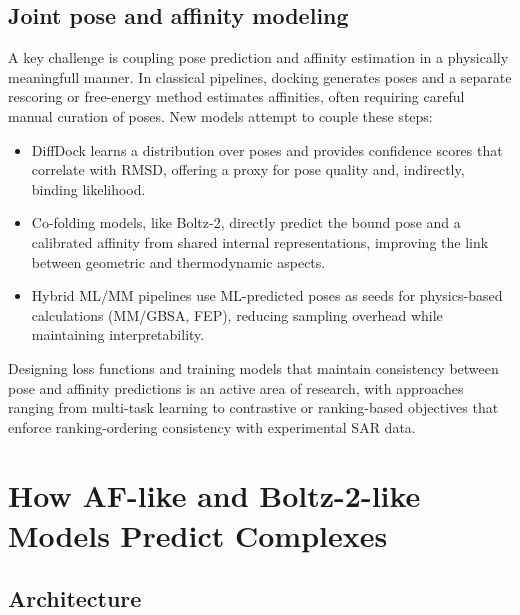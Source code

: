 \documentclass[12pt]{article}
\begin{document}
\subsection{Joint pose and affinity modeling}

A key challenge is coupling pose prediction and affinity estimation in a physically meaningfull manner. In classical pipelines, docking generates poses and a separate rescoring or free-energy method estimates affinities, often requiring careful manual curation of poses. New models attempt to couple these steps:
\begin{itemize}
  \item DiffDock learns a distribution over poses and provides confidence scores that correlate with RMSD, offering a proxy for pose quality and, indirectly, binding likelihood.
  \item Co-folding models, like Boltz-2, directly predict the bound pose and a calibrated affinity from shared internal representations, improving the link between geometric and thermodynamic aspects.\cite{CH13_passaro2025boltz2}
  \item Hybrid ML/MM pipelines use ML-predicted poses as seeds for physics-based calculations (MM/GBSA, FEP), reducing sampling overhead while maintaining interpretability.
\end{itemize}

Designing loss functions and training models that maintain consistency between pose and affinity predictions is an active area of research, with approaches ranging from multi-task learning to contrastive or ranking-based objectives that enforce ranking-ordering consistency with experimental SAR data.\cite{CH13_shen2023generalized,CH13_durant2025robustly}

\section{How AF-like and Boltz-2-like Models Predict Complexes}

\subsection{Architecture}
\end{document}
